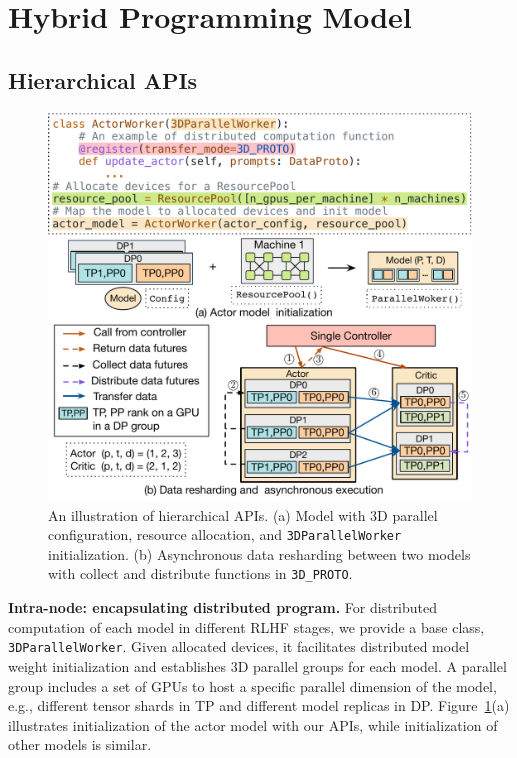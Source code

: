 \vspace{-2mm}
\section{Hybrid Programming Model}  \label{sec:programming_model}


\subsection{Hierarchical APIs}












\begin{figure}[t]
    \includegraphics[width=\linewidth]{figs/fig_api_code_with_figures_highlight_box.pdf}
    \vspace{-8mm}
    \caption{An illustration of hierarchical APIs. (a) Model with 3D parallel configuration, resource allocation, and \texttt{3DParallelWorker} initialization. (b) Asynchronous data resharding between two models with collect and distribute functions in \texttt{3D\_PROTO}.
    }
    \label{fig:api_figure}
    \vspace{-5mm}
\end{figure}


\noindent\textbf{Intra-node: encapsulating distributed program.}
For distributed computation of each model
in different RLHF stages, we provide a base class, \verb|3DParallelWorker|. Given allocated devices, it facilitates distributed model weight initialization and establishes 3D parallel groups for each model. A parallel group includes a set of GPUs to host a specific parallel dimension of the model, e.g., different tensor shards in TP and different model replicas in DP. Figure~\ref{fig:api_figure}(a) illustrates initialization of the actor model with our APIs, while initialization of other models is similar.





